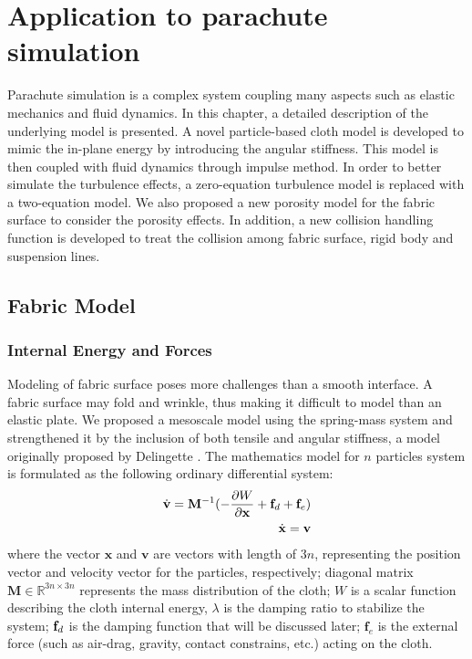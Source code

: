 \chapter{Application to parachute simulation}
Parachute simulation is a complex system coupling many aspects such as 
elastic mechanics and fluid dynamics. In this chapter, a detailed description 
of the underlying model is presented. A novel particle-based cloth model is 
developed to mimic the in-plane energy by introducing the angular 
stiffness. This model is then coupled with fluid dynamics through impulse 
method. In order to better simulate the turbulence effects, a zero-equation 
turbulence model is replaced with a two-equation model. We also proposed a new 
porosity model for the fabric surface to consider the porosity effects. 
In addition, a new collision handling function is developed to treat the collision among 
fabric surface, rigid body and suspension lines.

\section{Fabric Model}
\subsection{Internal Energy and Forces}
Modeling of fabric surface poses more challenges than
a smooth interface. A fabric surface may fold and wrinkle, thus making it
difficult to model than an elastic plate. We proposed a mesoscale model using
the spring-mass system and strengthened it by the inclusion of both tensile and
angular stiffness, a model originally proposed by Delingette \cite{Delinget2008}.
The mathematics model for $n$ particles system is formulated as the following ordinary differential system:
\begin{eqnarray}
\dot{\mathbf{v}} = \mathbf{M}^{-1}(-\frac{\partial W}{\partial \mathbf{x}} 
				+ \mathbf{f}_d + \mathbf{f}_e) \label{eq:spring_model}\\
\dot{\mathbf{x}} = \mathbf{v}
\end{eqnarray}
where the vector $\mathbf{x}$ and $\mathbf{v}$ are vectors with length of $3n$, representing the position vector and velocity vector for the particles, respectively; diagonal matrix $\mathbf{M} \in \mathbb{R}^{3n\times 3n}$ represents the mass distribution of the cloth; $W$ is a scalar function describing the cloth internal energy, $\lambda$ is the damping ratio to stabilize the system; $\mathbf{f}_d$ is the damping function that will be discussed later; $\mathbf{f}_e$ is the external force (such as air-drag, gravity, contact constrains, etc.) acting on the cloth.

